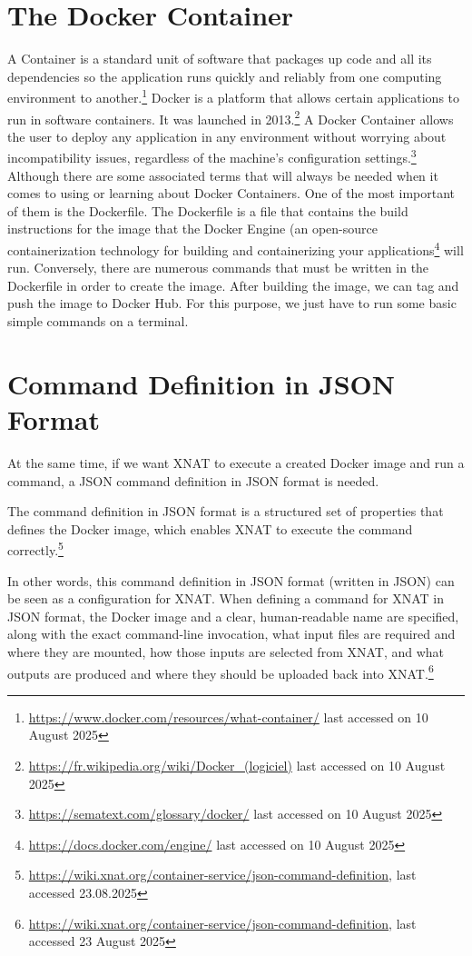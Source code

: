 \section{The Docker Container}
A Container is a standard unit of software that packages up code and all its dependencies so the application runs quickly and reliably from one computing environment to another.\footnote{\url{https://www.docker.com/resources/what-container/} { last accessed on 10 August 2025}}
Docker is a platform that allows certain applications to run in software containers. It was launched in 2013.\footnote{\url{https://fr.wikipedia.org/wiki/Docker\_(logiciel)} { last accessed on 10 August 2025}} A Docker Container allows the user to deploy any application in any environment without worrying about incompatibility issues, regardless of the machine’s configuration settings.\footnote{\url{https://sematext.com/glossary/docker/} {last accessed on 10 August 2025}} Although there are some associated terms that will always be needed when it comes to using or learning about Docker Containers.
One of the most important of them is the Dockerfile. The Dockerfile is a file that contains the build instructions for the image that the Docker Engine (an open-source containerization technology for building and containerizing your applications\footnote{\url{https://docs.docker.com/engine/} { last accessed on 10 August 2025}} will run. Conversely, there are numerous commands that must be written in the Dockerfile in order to create the image. After building the image, we can tag and push the image to Docker Hub. For this purpose, we just have to run some basic simple commands on a terminal.
\\
\section{Command Definition in JSON Format}
At the same time, if we want XNAT to execute a created Docker image and run a command, a \ac{JSON} command definition in JSON format is needed. 

The command definition in JSON format is a structured set of properties that defines the Docker image, which enables XNAT to execute the command correctly.\footnote{\url{https://wiki.xnat.org/container-service/json-command-definition}, { last accessed 23.08.2025}}

In other words, this command definition in JSON format (written in JSON) can be seen as a configuration for XNAT. When defining a command for XNAT in JSON format, the Docker image and a clear, human-readable name are specified, along with the exact command-line invocation, what input files are required and where they are mounted, how those inputs are selected from XNAT, and what outputs are produced and where they should be uploaded back into XNAT.\footnote{\url{https://wiki.xnat.org/container-service/json-command-definition}, { last accessed 23 August 2025}}
